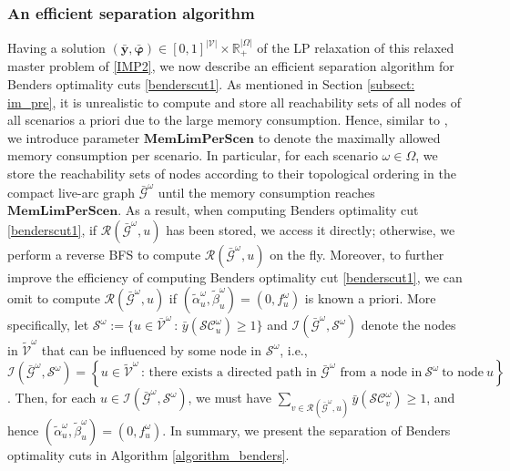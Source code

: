 \documentclass[a4paper,10pt]{article}
\newcommand{\st}{\,:\,}
\newcommand{\G}{\mathcal{G}}
\theoremstyle{plain}
\newcommand{\revv}[1]{{#1}}
\begin{document}
{	
	
	
	\subsubsection{\revv{An efficient separation algorithm}}
	
	Having a solution \revv{$(\bar{\boldsymbol{y}},\bar{\boldsymbol{\varphi}}) \in [0,1]^{|\mathcal{V}|} \times \mathbb{R}_+^{|\Omega|}$} of the LP relaxation of this relaxed master problem \revv{of \eqref{IMP2}},
	\revv{we now describe an efficient separation algorithm for} Benders optimality cuts \eqref{benderscut1}.
	\revv{As mentioned in Section \ref{subsect: im_pre}}, it is unrealistic to compute and store all reachability sets of all nodes of all scenarios a priori due to the large memory consumption.
	Hence, similar to \cite{Guney2020}, we introduce parameter $\mathbf{MemLimPerScen}$ to denote the maximally allowed memory consumption per scenario.
	In particular, for each scenario $\omega\in\Omega$, we store the reachability sets of nodes according to their topological ordering in the compact live-arc graph $\bar{\G}^{\omega}$ until the memory consumption reaches $\mathbf{MemLimPerScen}$.
	As a result, when computing Benders optimality cut \eqref{benderscut1}, if $\mathcal{R}(\bar{\mathcal{G}}^{\omega},u)$ has been stored, we access it directly;
	otherwise, we perform a reverse BFS to compute $\mathcal{R}(\bar{\mathcal{G}}^{\omega},u)$ on the fly.
	Moreover, to further improve the efficiency of computing Benders optimality cut \eqref{benderscut1}, we can omit to compute $\mathcal{R}(\bar{\mathcal{G}}^{\omega},u)$ if $\revv{(\tilde{\alpha}_u^{\omega},\tilde{\beta}_u^{\omega})}= (0, f_u^\omega)$ is known a priori.
	More specifically, let $\mathcal{S}^{\omega}:=\{u\in\bar{\mathcal{V}}^{\omega}\,:\,\bar{y}(\mathcal{SC}_u^{\omega})
	\geq1\}$ and \revv{$\revv{\mathcal{I}(\bar{\mathcal{G}}^\omega, \mathcal{S}^{\omega})}$ denote the nodes in $ \tilde{\mathcal{V}}^\omega$ that can be influenced by some node in $\mathcal{S}^\omega$, i.e., $\revv{\mathcal{I}(\bar{\mathcal{G}}^\omega, \mathcal{S}^{\omega})}=\left \{u\in\tilde{\mathcal{V}}^{\omega}\,:\,  \text{there exists~a~directed~path~in~$\bar{\mathcal{G}}^\omega$~from~a~node~in}~\mathcal{S}^{\omega}~\text{to~node}~u\right\}$}.
	Then, for each $u\in \revv{\mathcal{I}(\bar{\mathcal{G}}^\omega, \mathcal{S}^{\omega})}$, we must have  $\sum_{v\in\mathcal{R}(\bar{\mathcal{G}}^{\omega},u)}\bar{y}(\mathcal{SC}_v^{\omega})
	\geq1$, and hence $\revv{(\tilde{\alpha}_u^{\omega},\tilde{\beta}_u^{\omega})}= (0, f_u^\omega)$.
	In summary, we present the separation of Benders optimality cuts in Algorithm \ref{algorithm_benders}.
	
}
\end{document}
